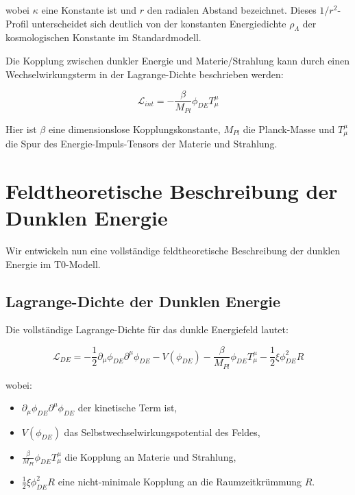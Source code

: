 \documentclass[a4paper,12pt]{article}
\begin{document}
wobei $\kappa$ eine Konstante ist und $r$ den radialen Abstand bezeichnet. Dieses $1/r^2$-Profil unterscheidet sich deutlich von der konstanten Energiedichte $\rho_\Lambda$ der kosmologischen Konstante im Standardmodell.

Die Kopplung zwischen dunkler Energie und Materie/Strahlung kann durch einen Wechselwirkungsterm in der Lagrange-Dichte beschrieben werden:

\begin{equation}
	\mathcal{L}_{int} = -\frac{\beta}{M_{Pl}} \phi_{DE} T^{\mu}_{\mu}
\end{equation}

Hier ist $\beta$ eine dimensionslose Kopplungskonstante, $M_{Pl}$ die Planck-Masse und $T^{\mu}_{\mu}$ die Spur des Energie-Impuls-Tensors der Materie und Strahlung.

\section{Feldtheoretische Beschreibung der Dunklen Energie}

Wir entwickeln nun eine vollständige feldtheoretische Beschreibung der dunklen Energie im T0-Modell.

\subsection{Lagrange-Dichte der Dunklen Energie}

Die vollständige Lagrange-Dichte für das dunkle Energiefeld lautet:

\begin{equation}
	\mathcal{L}_{DE} = -\frac{1}{2}\partial_\mu \phi_{DE} \partial^\mu \phi_{DE} - V(\phi_{DE}) - \frac{\beta}{M_{Pl}} \phi_{DE} T^{\mu}_{\mu} - \frac{1}{2}\xi \phi_{DE}^2 R
\end{equation}

wobei:
\begin{itemize}
	\item $\partial_\mu \phi_{DE} \partial^\mu \phi_{DE}$ der kinetische Term ist,
	\item $V(\phi_{DE})$ das Selbstwechselwirkungspotential des Feldes,
	\item $\frac{\beta}{M_{Pl}} \phi_{DE} T^{\mu}_{\mu}$ die Kopplung an Materie und Strahlung,
	\item $\frac{1}{2}\xi \phi_{DE}^2 R$ eine nicht-minimale Kopplung an die Raumzeitkrümmung $R$.
\end{itemize}
\end{document}
